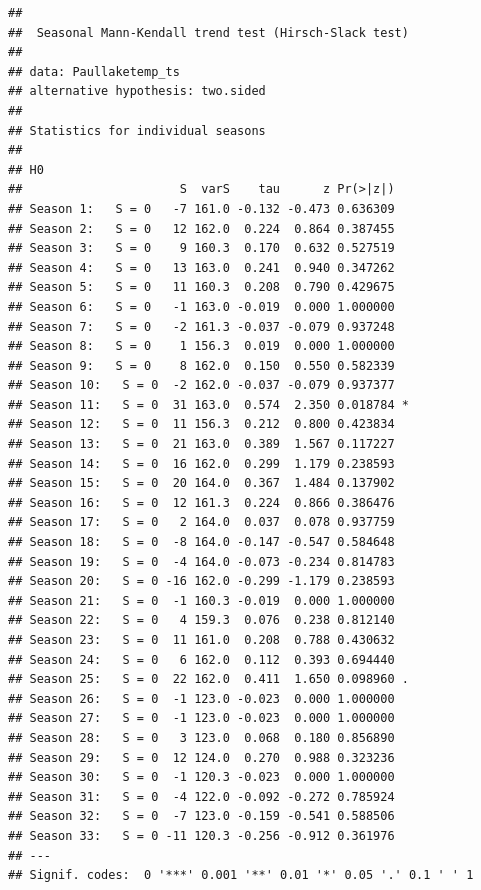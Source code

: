 \documentclass[12pt,]{article}
\newenvironment{Shaded}{\begin{snugshade}}{\end{snugshade}}
\newcommand{\KeywordTok}[1]{\textcolor[rgb]{0.13,0.29,0.53}{\textbf{#1}}}
\newcommand{\DataTypeTok}[1]{\textcolor[rgb]{0.13,0.29,0.53}{#1}}
\newcommand{\DecValTok}[1]{\textcolor[rgb]{0.00,0.00,0.81}{#1}}
\newcommand{\StringTok}[1]{\textcolor[rgb]{0.31,0.60,0.02}{#1}}
\newcommand{\OperatorTok}[1]{\textcolor[rgb]{0.81,0.36,0.00}{\textbf{#1}}}
\newcommand{\NormalTok}[1]{#1}
\begin{document}
\begin{verbatim}
## 
##  Seasonal Mann-Kendall trend test (Hirsch-Slack test)
## 
## data: Paullaketemp_ts
## alternative hypothesis: two.sided
## 
## Statistics for individual seasons
## 
## H0
##                      S  varS    tau      z Pr(>|z|)  
## Season 1:   S = 0   -7 161.0 -0.132 -0.473 0.636309  
## Season 2:   S = 0   12 162.0  0.224  0.864 0.387455  
## Season 3:   S = 0    9 160.3  0.170  0.632 0.527519  
## Season 4:   S = 0   13 163.0  0.241  0.940 0.347262  
## Season 5:   S = 0   11 160.3  0.208  0.790 0.429675  
## Season 6:   S = 0   -1 163.0 -0.019  0.000 1.000000  
## Season 7:   S = 0   -2 161.3 -0.037 -0.079 0.937248  
## Season 8:   S = 0    1 156.3  0.019  0.000 1.000000  
## Season 9:   S = 0    8 162.0  0.150  0.550 0.582339  
## Season 10:   S = 0  -2 162.0 -0.037 -0.079 0.937377  
## Season 11:   S = 0  31 163.0  0.574  2.350 0.018784 *
## Season 12:   S = 0  11 156.3  0.212  0.800 0.423834  
## Season 13:   S = 0  21 163.0  0.389  1.567 0.117227  
## Season 14:   S = 0  16 162.0  0.299  1.179 0.238593  
## Season 15:   S = 0  20 164.0  0.367  1.484 0.137902  
## Season 16:   S = 0  12 161.3  0.224  0.866 0.386476  
## Season 17:   S = 0   2 164.0  0.037  0.078 0.937759  
## Season 18:   S = 0  -8 164.0 -0.147 -0.547 0.584648  
## Season 19:   S = 0  -4 164.0 -0.073 -0.234 0.814783  
## Season 20:   S = 0 -16 162.0 -0.299 -1.179 0.238593  
## Season 21:   S = 0  -1 160.3 -0.019  0.000 1.000000  
## Season 22:   S = 0   4 159.3  0.076  0.238 0.812140  
## Season 23:   S = 0  11 161.0  0.208  0.788 0.430632  
## Season 24:   S = 0   6 162.0  0.112  0.393 0.694440  
## Season 25:   S = 0  22 162.0  0.411  1.650 0.098960 .
## Season 26:   S = 0  -1 123.0 -0.023  0.000 1.000000  
## Season 27:   S = 0  -1 123.0 -0.023  0.000 1.000000  
## Season 28:   S = 0   3 123.0  0.068  0.180 0.856890  
## Season 29:   S = 0  12 124.0  0.270  0.988 0.323236  
## Season 30:   S = 0  -1 120.3 -0.023  0.000 1.000000  
## Season 31:   S = 0  -4 122.0 -0.092 -0.272 0.785924  
## Season 32:   S = 0  -7 123.0 -0.159 -0.541 0.588506  
## Season 33:   S = 0 -11 120.3 -0.256 -0.912 0.361976  
## ---
## Signif. codes:  0 '***' 0.001 '**' 0.01 '*' 0.05 '.' 0.1 ' ' 1
\end{verbatim}

\begin{Shaded}
\end{Shaded}
\end{document}

